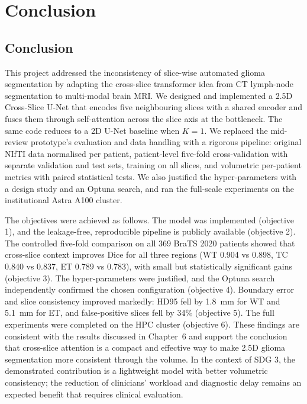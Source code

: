 \clearpage
\chapter{Conclusion}
\section{Conclusion}
This project addressed the inconsistency of slice-wise automated glioma segmentation by adapting the cross-slice transformer idea from CT lymph-node segmentation to multi-modal brain MRI. We designed and implemented a 2.5D Cross-Slice U-Net that encodes five neighbouring slices with a shared encoder and fuses them through self-attention across the slice axis at the bottleneck. The same code reduces to a 2D U-Net baseline when $K=1$. We replaced the mid-review prototype's evaluation and data handling with a rigorous pipeline: original NIfTI data normalised per patient, patient-level five-fold cross-validation with separate validation and test sets, training on all slices, and volumetric per-patient metrics with paired statistical tests. We also justified the hyper-parameters with a design study and an Optuna search, and ran the full-scale experiments on the institutional Astra A100 cluster.

The objectives were achieved as follows. The model was implemented (objective 1), and the leakage-free, reproducible pipeline is publicly available (objective 2). The controlled five-fold comparison on all 369 BraTS 2020 patients showed that cross-slice context improves Dice for all three regions (WT 0.904 vs 0.898, TC 0.840 vs 0.837, ET 0.789 vs 0.783), with small but statistically significant gains (objective 3). The hyper-parameters were justified, and the Optuna search independently confirmed the chosen configuration (objective 4). Boundary error and slice consistency improved markedly: HD95 fell by 1.8~mm for WT and 5.1~mm for ET, and false-positive slices fell by 34\% (objective 5). The full experiments were completed on the HPC cluster (objective 6). These findings are consistent with the results discussed in Chapter~6 and support the conclusion that cross-slice attention is a compact and effective way to make 2.5D glioma segmentation more consistent through the volume. In the context of SDG 3, the demonstrated contribution is a lightweight model with better volumetric consistency; the reduction of clinicians' workload and diagnostic delay remains an expected benefit that requires clinical evaluation.

